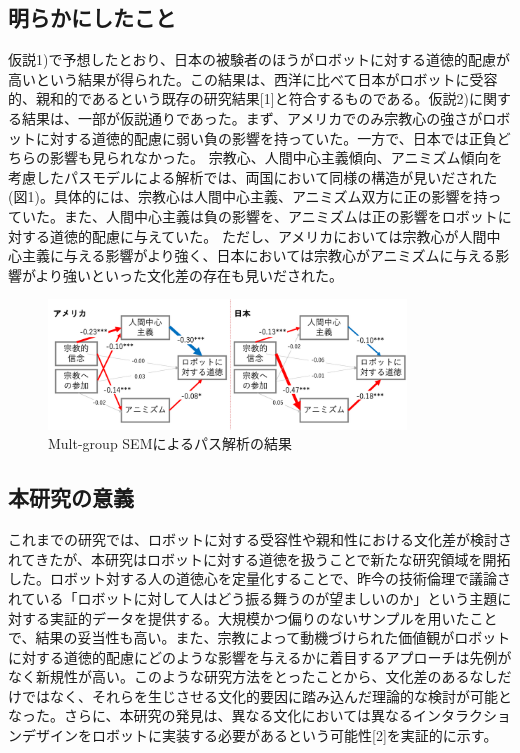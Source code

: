 \documentclass[twocolumn, a4j,10pt]{jarticle}
\begin{document}
\subsection*{明らかにしたこと}\vspace{-3mm}
仮説1)で予想したとおり、日本の被験者のほうがロボットに対する道徳的配慮が高いという結果が得られた。この結果は、西洋に比べて日本がロボットに受容的、親和的であるという既存の研究結果[1]と符合するものである。仮説2)に関する結果は、一部が仮説通りであった。まず、アメリカでのみ宗教心の強さがロボットに対する道徳的配慮に弱い負の影響を持っていた。一方で、日本では正負どちらの影響も見られなかった。
宗教心、人間中心主義傾向、アニミズム傾向を考慮したパスモデルによる解析では、両国において同様の構造が見いだされた(図1)。具体的には、宗教心は人間中心主義、アニミズム双方に正の影響を持っていた。また、人間中心主義は負の影響を、アニミズムは正の影響をロボットに対する道徳的配慮に与えていた。
ただし、アメリカにおいては宗教心が人間中心主義に与える影響がより強く、日本においては宗教心がアニミズムに与える影響がより強いといった文化差の存在も見いだされた。
\begin{figure}[H]
 \centering
 \includegraphics[keepaspectratio, width=9.5cm]{images/sem2.png}
 \caption{Mult-group SEMによるパス解析の結果}
 \label{sem}
\end{figure}

\vspace{-7mm}
\subsection*{本研究の意義}\vspace{-3mm}
これまでの研究では、ロボットに対する受容性や親和性における文化差が検討されてきたが、本研究はロボットに対する道徳を扱うことで新たな研究領域を開拓した。ロボット対する人の道徳心を定量化することで、昨今の技術倫理で議論されている「ロボットに対して人はどう振る舞うのが望ましいのか」という主題に対する実証的データを提供する。大規模かつ偏りのないサンプルを用いたことで、結果の妥当性も高い。また、宗教によって動機づけられた価値観がロボットに対する道徳的配慮にどのような影響を与えるかに着目するアプローチは先例がなく新規性が高い。このような研究方法をとったことから、文化差のあるなしだけではなく、それらを生じさせる文化的要因に踏み込んだ理論的な検討が可能となった。さらに、本研究の発見は、異なる文化においては異なるインタラクションデザインをロボットに実装する必要があるという可能性[2]を実証的に示す。\vspace{-4mm}
\thispagestyle{empty}
\end{document}
